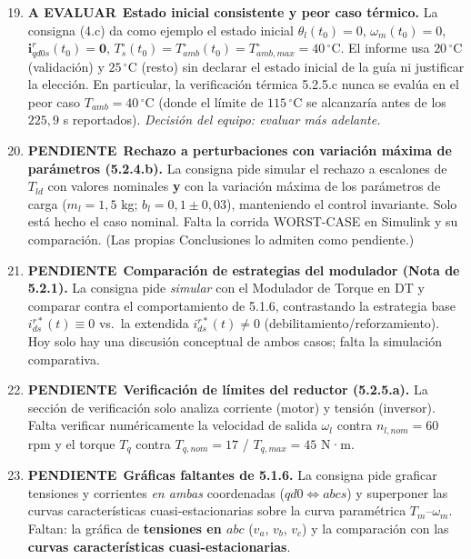 \documentclass[11pt,a4paper]{article}
\newcommand{\pendiente}{\textcolor{errred}{\textbf{PENDIENTE}}}
\newcommand{\evaluar}{\textcolor{warnorange}{\textbf{A EVALUAR}}}
\begin{document}
\begin{enumerate}[label=\textbf{ID \arabic*.}, leftmargin=1.6cm]
  \setcounter{enumi}{18}
  \item \evaluar\ \textbf{Estado inicial consistente y peor caso térmico.} La consigna (4.c) da como ejemplo el estado inicial $\theta_l(t_0)=0$, $\omega_m(t_0)=0$, $\bm{i}^r_{qd0s}(t_0)=\bm{0}$, $T^\circ_s(t_0)=T^\circ_{amb}(t_0)=T^\circ_{amb,max}=40\,^\circ$C. El informe usa $20\,^\circ$C (validación) y $25\,^\circ$C (resto) sin declarar el estado inicial de la guía ni justificar la elección. En particular, la verificación térmica 5.2.5.c nunca se evalúa en el peor caso $T_{amb}=40\,^\circ$C (donde el límite de $115\,^\circ$C se alcanzaría antes de los $225{,}9$ s reportados). \emph{Decisión del equipo: evaluar más adelante.}
  \setcounter{enumi}{28}
  \item \pendiente\ \textbf{Rechazo a perturbaciones con variación máxima de parámetros (5.2.4.b).} La consigna pide simular el rechazo a escalones de $T_{ld}$ con valores nominales \textbf{y} con la variación máxima de los parámetros de carga ($m_l=1{,}5$ kg; $b_l=0{,}1\pm0{,}03$), manteniendo el control invariante. Solo está hecho el caso nominal. Falta la corrida WORST-CASE en Simulink y su comparación. (Las propias Conclusiones lo admiten como pendiente.)
  \item \pendiente\ \textbf{Comparación de estrategias del modulador (Nota de 5.2.1).} La consigna pide \emph{simular} con el Modulador de Torque en DT y comparar contra el comportamiento de 5.1.6, contrastando la estrategia base $i^{r*}_{ds}(t)\equiv 0$ vs.\ la extendida $i^{r*}_{ds}(t)\neq 0$ (debilitamiento/reforzamiento). Hoy solo hay una discusión conceptual de ambos casos; falta la simulación comparativa.
  \item \pendiente\ \textbf{Verificación de límites del reductor (5.2.5.a).} La sección de verificación solo analiza corriente (motor) y tensión (inversor). Falta verificar numéricamente la velocidad de salida $\omega_l$ contra $n_{l,nom}=60$ rpm y el torque $T_q$ contra $T_{q,nom}=17$ / $T_{q,max}=45$ N·m.
  \item \pendiente\ \textbf{Gráficas faltantes de 5.1.6.} La consigna pide graficar tensiones y corrientes \emph{en ambas} coordenadas ($qd0 \Leftrightarrow abcs$) y superponer las curvas características cuasi-estacionarias sobre la curva paramétrica $T_m$--$\omega_m$. Faltan: la gráfica de \textbf{tensiones en $abc$} ($v_a$, $v_b$, $v_c$) y la comparación con las \textbf{curvas características cuasi-estacionarias}.
\end{enumerate}
\end{document}
